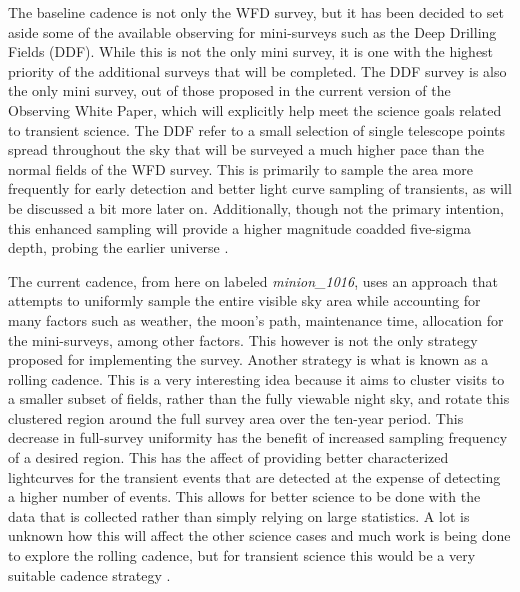 \documentclass[12pt]{article}
\begin{document}
The baseline cadence is not only the WFD survey, but it has been decided to set aside some of the available observing for mini-surveys such as the Deep Drilling Fields (DDF). While this is not the only mini survey, it is one with the highest priority of the additional surveys that will be completed. The DDF survey is also the only mini survey, out of those proposed in the current version of the Observing White Paper, which will explicitly help meet the science goals related to transient science. The DDF refer to a small selection of single telescope points spread throughout the sky that will be surveyed a much higher pace than the normal fields of the WFD survey. This is primarily to sample the area more frequently for early detection and better light curve sampling of transients, as will be discussed a bit more later on. Additionally, though not the primary intention, this enhanced sampling will provide a higher magnitude coadded five-sigma depth, probing the earlier universe \citep{LSSTScienceCollaboration2017}. \par
The current cadence, from here on labeled \textit{minion\_1016}, uses an approach that attempts to uniformly sample the entire visible sky area while accounting for many factors such as weather, the moon's path, maintenance time, allocation for the mini-surveys, among other factors. This however is not the only strategy proposed for implementing the survey. Another strategy is what is known as a rolling cadence. This is a very interesting idea because it aims to cluster visits to a smaller subset of fields, rather than the fully viewable night sky, and rotate this clustered region around the full survey area over the ten-year period. This decrease in full-survey uniformity has the benefit of increased sampling frequency of a desired region. This has the affect of providing better characterized lightcurves for the transient events that are detected at the expense of detecting a higher number of events. This allows for better science to be done with the data that is collected rather than simply relying on large statistics. A lot is unknown how this will affect the other science cases and much work is being done to explore the rolling cadence, but for transient science this would be a very suitable cadence strategy \citep{LSSTScienceCollaboration2017}. \par
\end{document}
